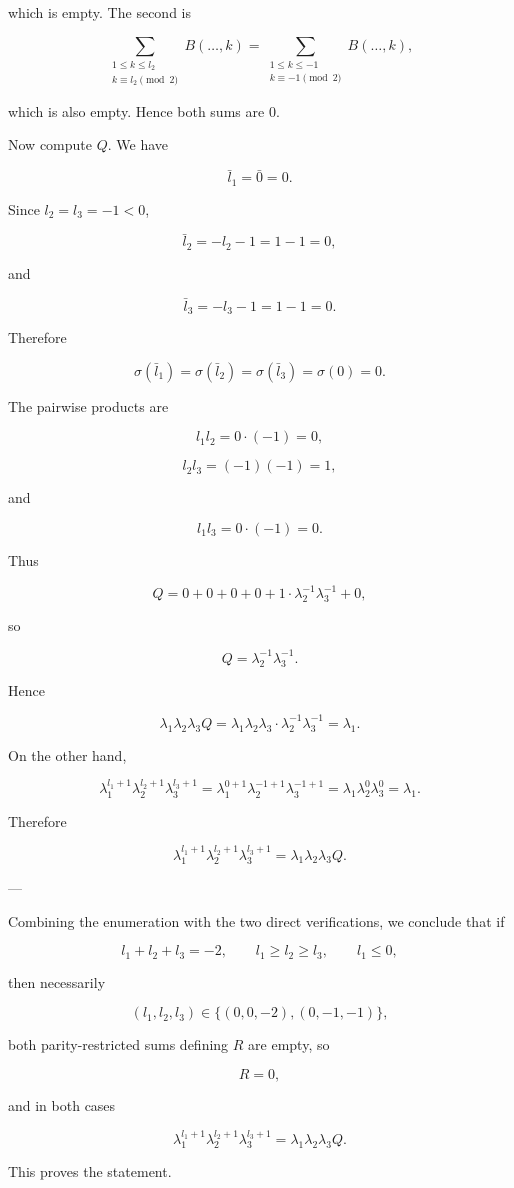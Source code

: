 which is empty. The second is

\[
\sum_{\substack{1\le k\le l_2\\ k\equiv l_2\pmod 2}} B(\ldots,k)
=
\sum_{\substack{1\le k\le -1\\ k\equiv -1\pmod 2}} B(\ldots,k),
\]

which is also empty. Hence both sums are $0$.

Now compute $Q$. We have

\[
\bar l_1=\bar 0=0.
\]

Since $l_2=l_3=-1<0$,

\[
\bar l_2=-l_2-1=1-1=0,
\]

and

\[
\bar l_3=-l_3-1=1-1=0.
\]

Therefore

\[
\sigma(\bar l_1)=\sigma(\bar l_2)=\sigma(\bar l_3)=\sigma(0)=0.
\]

The pairwise products are

\[
l_1l_2=0\cdot (-1)=0,
\]

\[
l_2l_3=(-1)(-1)=1,
\]

and

\[
l_1l_3=0\cdot (-1)=0.
\]

Thus

\[
Q
=
0
+
0
+
0
+
0
+
1\cdot \lambda_2^{-1}\lambda_3^{-1}
+
0,
\]

so

\[
Q=\lambda_2^{-1}\lambda_3^{-1}.
\]

Hence

\[
\lambda_1\lambda_2\lambda_3 Q
=
\lambda_1\lambda_2\lambda_3\cdot \lambda_2^{-1}\lambda_3^{-1}
=
\lambda_1.
\]

On the other hand,

\[
\lambda_1^{l_1+1}\lambda_2^{l_2+1}\lambda_3^{l_3+1}
=
\lambda_1^{0+1}\lambda_2^{-1+1}\lambda_3^{-1+1}
=
\lambda_1\lambda_2^0\lambda_3^0
=
\lambda_1.
\]

Therefore

\[
\lambda_1^{l_1+1}\lambda_2^{l_2+1}\lambda_3^{l_3+1}
=
\lambda_1\lambda_2\lambda_3 Q.
\]

---

Combining the enumeration with the two direct verifications, we conclude that if

\[
l_1+l_2+l_3=-2,\qquad l_1\ge l_2\ge l_3,\qquad l_1\le 0,
\]

then necessarily

\[
(l_1,l_2,l_3)\in\{(0,0,-2),(0,-1,-1)\},
\]

both parity-restricted sums defining $R$ are empty, so

\[
R=0,
\]

and in both cases

\[
\lambda_1^{l_1+1}\lambda_2^{l_2+1}\lambda_3^{l_3+1}
=
\lambda_1\lambda_2\lambda_3 Q.
\]

This proves the statement.